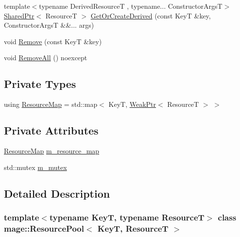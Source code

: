 \begin{DoxyCompactItemize}
\item 
{\footnotesize template$<$typename Derived\+ResourceT , typename... Constructor\+ArgsT$>$ }\\\hyperlink{namespacemage_a1e01ae66713838a7a67d30e44c67703e}{Shared\+Ptr}$<$ ResourceT $>$ \hyperlink{classmage_1_1_resource_pool_a085ad24ca18ca375c04133ace21d3cc2}{Get\+Or\+Create\+Derived} (const KeyT \&key, Constructor\+ArgsT \&\&... args)
\item 
void \hyperlink{classmage_1_1_resource_pool_a58801a2c21f973e18b84277ddaa60d74}{Remove} (const KeyT \&key)
\item 
void \hyperlink{classmage_1_1_resource_pool_ab524641cccb1edbf761b94779b5ca5bc}{Remove\+All} () noexcept
\end{DoxyCompactItemize}
\subsection*{Private Types}
\begin{DoxyCompactItemize}
\item 
using \hyperlink{classmage_1_1_resource_pool_a7ae3cfa639bbc3696fa359673fed6153}{Resource\+Map} = std\+::map$<$ KeyT, \hyperlink{namespacemage_aa159a63c0d58464bdf32dfe419dd5dc1}{Weak\+Ptr}$<$ ResourceT $>$ $>$
\end{DoxyCompactItemize}
\subsection*{Private Attributes}
\begin{DoxyCompactItemize}
\item 
\hyperlink{classmage_1_1_resource_pool_a7ae3cfa639bbc3696fa359673fed6153}{Resource\+Map} \hyperlink{classmage_1_1_resource_pool_a5b72496aa427f783a6de90d8ee7ff2a5}{m\+\_\+resource\+\_\+map}
\item 
std\+::mutex \hyperlink{classmage_1_1_resource_pool_a3d6d7b0e2e9c3271f8ae3b7c2fa704ba}{m\+\_\+mutex}
\end{DoxyCompactItemize}


\subsection{Detailed Description}
\subsubsection*{template$<$typename KeyT, typename ResourceT$>$\newline
class mage\+::\+Resource\+Pool$<$ Key\+T, Resource\+T $>$}

